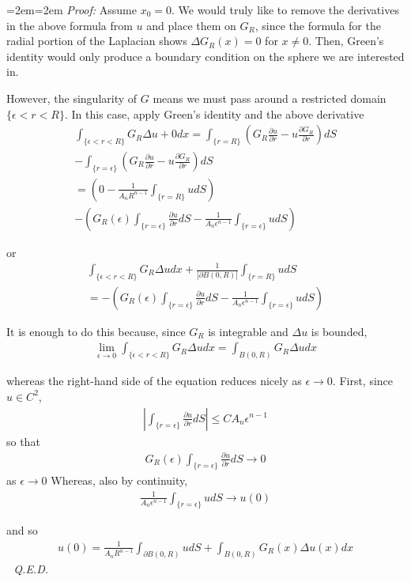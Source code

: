 \documentclass{article}
\newcommand{\pd}{\partial}
\newenvironment{pf}{%
	\par%
	\medskip
	\leftskip=2em\rightskip=2em%
	\noindent\ignorespaces \textit{Proof:} \newline}{%
	\,\, \newline \textit{Q.E.D.}\par\medskip}
\begin{document}
	\begin{pf}
		Assume $x_0 = 0$. We would truly like to remove the derivatives in the above formula from $u$ and place them on $G_{R}$, since the formula for the radial portion of the Laplacian shows $\Delta G_{R}(x) = 0$ for $x \neq 0$. Then, Green's identity would only produce a boundary condition on the sphere we are interested in. 
		
		However, the singularity of $G$ means we must pass around a restricted domain $\{\epsilon < r < R\}$. In this case, apply Green's identity and the above derivative
		\begin{align*}
			\int_{\{\epsilon < r < R\}} G_{R} \Delta u + 0 dx = \int_{\{r=R\}} \left(G_{R} \frac{\pd u}{\pd r} - u \frac{\pd G_{R}}{\pd r} \right) dS \\
			- \int_{\{r = \epsilon\}} \left(G_{R} \frac{\pd u}{\pd r} - u \frac{\pd G_{R}}{\pd r} \right) dS \\
			= \left(0 - \frac{1}{A_{n}R^{n-1}} \int_{\{r=R\}} u dS \right) \\
			- \left(G_{R}(\epsilon) \int_{\{r=\epsilon\}} \frac{\pd u}{\pd r} dS - \frac{1}{A_{n} \epsilon^{n-1}} \int_{\{r = \epsilon\}} u dS \right)
		\end{align*} 
		
		or 
		\begin{align*}
			\int_{\{\epsilon < r < R\}} G_{R} \Delta u  dx + \frac{1}{|\pd B(0,R)|} \int_{\{r=R\}} u dS \\
			= - \left(G_{R}(\epsilon) \int_{\{r=\epsilon\}} \frac{\pd u}{\pd r} dS - \frac{1}{A_{n} \epsilon^{n-1}} \int_{\{r = \epsilon\}} u dS \right)
		\end{align*}
		
		
		It is enough to do this because, since $G_{R}$ is integrable and $\Delta u$ is bounded, 
		\begin{align*}
			\lim_{\epsilon \to 0} \int_{\{\epsilon < r < R\}} G_{R}\Delta u dx = \int_{B(0,R)} G_{R} \Delta u dx
		\end{align*}
		
		whereas the right-hand side of the equation reduces nicely as $\epsilon \to 0$. First, since $u \in C^{2}$, 
		\begin{align*}
			| \int_{\{r = \epsilon\}} \frac{\pd u}{\pd r} dS| \leq C A_{n} \epsilon^{n-1} 
		\end{align*}
		so that 
		\begin{align*}
			G_{R}(\epsilon) \int_{\{r=\epsilon\}} \frac{\pd u}{\pd r} dS \to 0
		\end{align*}
		as $\epsilon \to 0$
		Whereas, also by continuity, 
		\begin{align*}
			\frac{1}{A_{n} \epsilon^{n-1}} \int_{\{r = \epsilon\}} u dS \to u(0)
		\end{align*}
		
		and so 
		\begin{align*}
			u(0) = \frac{1}{A_{n}R^{n-1}} \int_{\pd B(0,R) }udS + \int_{B(0,R)} G_{R}(x)\Delta u(x) dx
		\end{align*}
	\end{pf}
	
\end{document}
